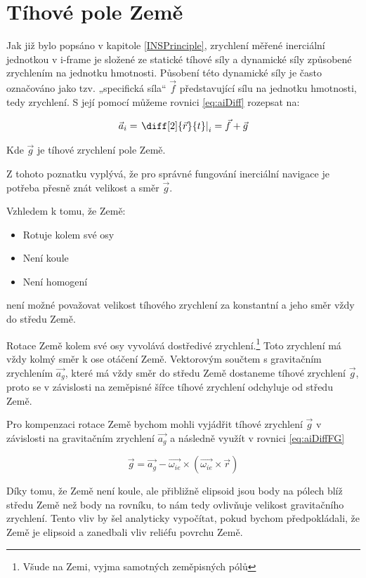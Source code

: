 \section{Tíhové pole Země}
Jak již bylo popsáno v kapitole \ref{INSPrinciple}, zrychlení měřené inerciální jednotkou v i-frame je složené ze statické tíhové síly a dynamické síly způsobené zrychlením na jednotku hmotnosti. Působení této dynamické síly je často označováno jako tzv. „specifická síla“ $ \vec{f} $ představující sílu na jednotku hmotnosti, tedy zrychlení. S její pomocí můžeme rovnici \ref{eq:aiDiff} rozepsat na: \cite{Tittertonc2004} \cite{Grewal2013}

\begin{equation} \label{eq:aiDiffFG}
\vec{a}_{i} = \left. \diff[2]{\vec{r}}{t} \right|_{i} = \vec{f} + \vec{g}
\end{equation}

Kde $ \vec{g} $ je tíhové zrychlení pole Země.

Z tohoto poznatku vyplývá, že pro správné fungování inerciální navigace je potřeba přesně znát velikost a směr $ \vec{g} $. 

Vzhledem k tomu, že Země: \cite{Halliday2000}
\begin{itemize}
\item Rotuje kolem své osy
\item Není koule
\item Není homogení
\end{itemize}
není možné považovat velikost tíhového zrychlení za konstantní a jeho směr vždy do středu Země.

Rotace Země kolem své osy vyvolává dostředivé zrychlení.\footnote{Všude na Zemi, vyjma samotných zeměpisných pólů}
Toto zrychlení má vždy kolmý směr k ose otáčení Země. Vektorovým součtem s gravitačním zrychlením $ \vec{a_{g}} $, které má vždy směr do středu Země dostaneme tíhové zrychlení $ \vec{g} $, proto se v závislosti na zeměpisné šířce tíhové zrychlení odchyluje od středu Země. \cite{Halliday2000}

Pro kompenzaci rotace Země bychom mohli vyjádřit tíhové zrychlení $ \vec{g} $ v závislosti na gravitačním zrychlení $ \vec{a_{g}} $ a následně využít v rovnici \ref{eq:aiDiffFG} \cite{Tittertonc2004}

\begin{equation} \label{eq:coriolis}
\vec{g}=\vec{a_{g}} - \vec{\omega_{ie}} \times (\vec{\omega_{ie}} \times \vec{r})
\end{equation}

Díky tomu, že Země není koule, ale přibližně elipsoid jsou body na pólech blíž středu Země než body na rovníku, to nám tedy ovlivňuje velikost gravitačního zrychlení. Tento vliv by šel analyticky vypočítat, pokud bychom předpokládali, že Země je elipsoid a zanedbali vliv reliéfu povrchu Země. \cite{Halliday2000}

